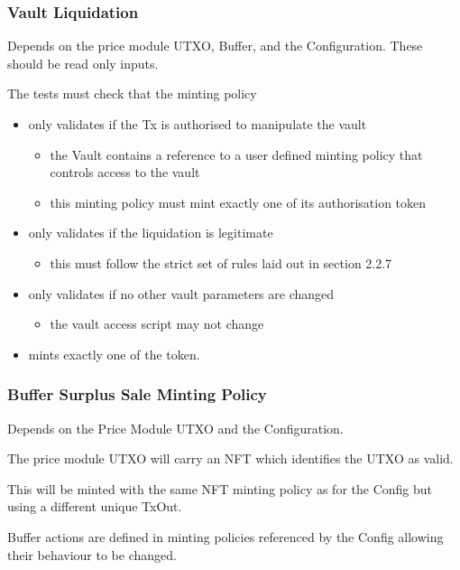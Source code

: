 \documentclass{article} %
\begin{document}
\subsubsection{Vault Liquidation}
Depends on the price module UTXO, Buffer, and the Configuration.
These should be read only inputs.

The tests must check that the minting policy
\begin{itemize}
  \item only validates if the Tx is authorised to manipulate the vault
  \begin{itemize}
    \item the Vault contains a reference to a user defined minting policy that controls access to the vault
    \item this minting policy must mint exactly one of its authorisation token
  \end{itemize}
  \item only validates if the liquidation is legitimate
  \begin{itemize}
    \item this must follow the strict set of rules laid out in section 2.2.7
  \end{itemize}
  \item only validates if no other vault parameters are changed
  \begin{itemize}
    \item the vault access script may not change 
  \end{itemize}
  \item mints exactly one of the token.
\end{itemize}

\subsubsection{Buffer Surplus Sale Minting Policy}
Depends on the Price Module UTXO and the Configuration.

The price module UTXO will carry an NFT which identifies the UTXO as valid.

This will be minted with the same NFT minting policy as for the Config but using a different unique TxOut.

Buffer actions are defined in minting policies referenced by the Config allowing their behaviour to be changed.
\end{document}
